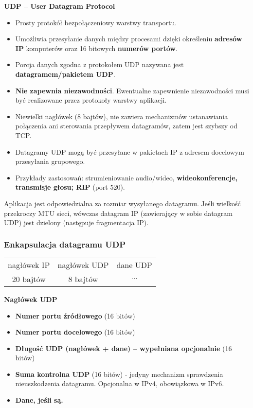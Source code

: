 \documentclass[../main.tex]{subfiles}
\begin{document}
    \textbf{UDP – User Datagram Protocol}
    \begin{itemize}
        \item Prosty protokół bezpołączeniowy warstwy transportu.
        \item Umożliwia przesyłanie danych między procesami dzięki określeniu \textbf{adresów IP} komputerów oraz 16 bitowych \textbf{numerów portów}.
        \item Porcja danych zgodna z protokołem UDP nazywana jest \textbf{datagramem/pakietem UDP}.
        \item \textbf{Nie zapewnia niezawodności}. Ewentualne zapewnienie niezawodności musi być realizowane przez protokoły warstwy aplikacji.
        \item Niewielki nagłówek (8 bajtów), nie zawiera mechanizmów ustanawiania połączenia ani sterowania przepływem datagramów, zatem jest szybszy od TCP.
        \item Datagramy UDP mogą być przesyłane w pakietach IP z adresem docelowym przesyłania grupowego.
        \item Przykłady zastosowań: strumieniowanie audio/wideo, \textbf{wideokonferencje, transmisje głosu; RIP} (port 520).
    \end{itemize}

    Aplikacja jest odpowiedzialna za rozmiar wysyłanego datagramu. Jeśli wielkość przekroczy
    MTU sieci, wówczas datagram IP (zawierający w sobie datagram UDP) jest dzielony
    (następuje fragmentacja IP).


    \subsubsection{Enkapsulacja datagramu UDP}

    \begin{tabular}{|c|c|c|}
        \hline
        nagłówek IP & nagłówek UDP & dane UDP\\
        20 bajtów & 8 bajtów & $\dots$\\
        \hline
    \end{tabular}

    \textbf{Nagłówek UDP}
    \begin{itemize}
        \item \textbf{Numer portu źródłowego} (16 bitów)
        \item \textbf{Numer portu docelowego} (16 bitów)
        \item \textbf{Długość UDP (nagłówek + dane) – wypełniana opcjonalnie} (16 bitów)
        \item \textbf{Suma kontrolna UDP} (16 bitów) - jedyny mechanizm sprawdzenia nieuszkodzenia datagramu. Opcjonalna w IPv4, obowiązkowa w IPv6.
        \item \textbf{Dane, jeśli są.}
    \end{itemize}
\end{document}
